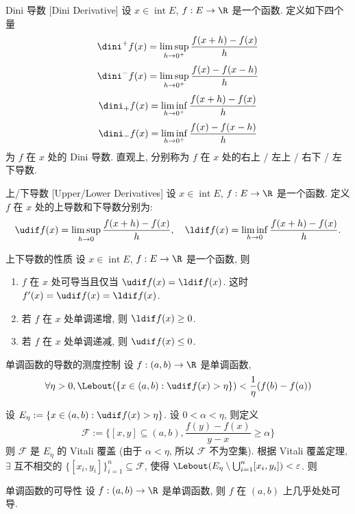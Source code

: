 \begin{dfn}
    {Dini 导数}
    [Dini Derivative]
    设 \(x \in \operatorname{int} E\), \(f: E \to \R\) 是一个函数. 定义如下四个量
    \[\dini^+ f(x) = \limsup_{h \to 0^+} \frac{f(x+h) - f(x)}{h} \]
    \[\dini^- f(x) = \limsup_{h \to 0^+} \frac{f(x) - f(x-h)}{h} \]
    \[\dini_+ f(x) = \liminf_{h \to 0^+} \frac{f(x+h) - f(x)}{h} \]
    \[\dini_- f(x) = \liminf_{h \to 0^+} \frac{f(x) - f(x-h)}{h} \]
    为 \(f\) 在 \(x\) 处的 Dini 导数. 直观上, 分别称为 \(f\) 在 \(x\) 处的右上 / 左上 / 右下 / 左下导数.
\end{dfn}
\begin{dfn}
    {上/下导数}
    [Upper/Lower Derivatives]
    设 \(x \in \operatorname{int} E\), \(f: E \to \R\) 是一个函数. 定义 \(f\) 在 \(x\) 处的上导数和下导数分别为:
    \[
    \udif f(x) = \limsup_{h \to 0} \frac{f(x+h) - f(x)}{h}, \quad \ldif f(x) = \liminf_{h \to 0} \frac{f(x+h) - f(x)}{h}.
    \]
\end{dfn}
\begin{ppt}
    {上下导数的性质}
    设 \(x \in \operatorname{int} E\), \(f: E \to \R\) 是一个函数, 则
    \begin{enumerate}
        \item \(f\) 在 \(x\) 处可导当且仅当 \(\udif f(x) = \ldif f(x)\). 这时 \(f'(x) = \udif f(x) = \ldif f(x)\).
        \item 若 \(f\) 在 \(x\) 处单调递增, 则 \(\ldif f(x) \geq 0\).
        \item 若 \(f\) 在 \(x\) 处单调递减, 则 \(\udif f(x) \leq 0\).
    \end{enumerate}
\end{ppt}
\begin{thm}
    {单调函数的导数的测度控制}
    设 \(f:(a,b)\to\R\) 是单调函数, 
    \[\forall\eta>0, \Lebout(\{x \in (a,b) : \udif f(x) > \eta\}) < \frac{1}{\eta} (f(b)-f(a)) \]
\end{thm}
\begin{prf}
    设 \(E_\eta := \{x \in (a,b) : \udif f(x) > \eta\}\). 设 \(0<\alpha<\eta\), 则定义
    \[\mathcal{F} := \{[x, y]\subseteq(a,b), \frac{f(y) - f(x)}{y - x} \geq \alpha\}\]
    则 \(\mathcal{F}\) 是 \(E_\eta\) 的 Vitali 覆盖 (由于 \(\alpha<\eta\), 所以 \(\mathcal{F}\) 不为空集). 根据 Vitali 覆盖定理, \(\exists\) 互不相交的 \(\{[x_i, y_i]\}_{i=1}^n \subseteq \mathcal{F}\), 使得 \(\Lebout(E_\eta \setminus \bigcup_{i=1}^n [x_i, y_i]) < \varepsilon\). 则
\end{prf}
\begin{thm}
    {单调函数的可导性}
    设 \(f:(a,b)\to\R\) 是单调函数, 则 \(f\) 在 \((a,b)\) 上几乎处处可导.
\end{thm}

